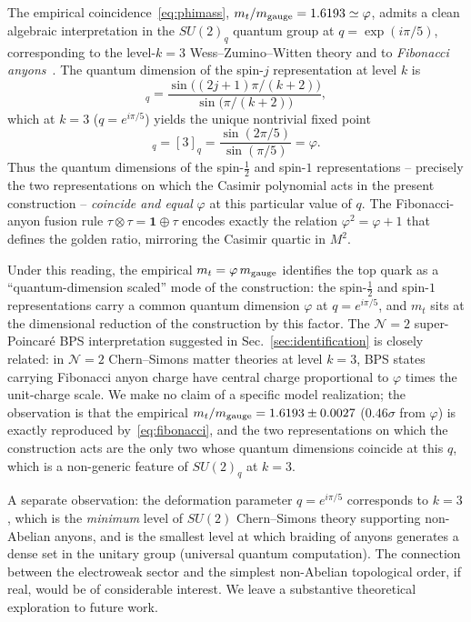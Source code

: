 \documentclass[twocolumn,aps,prd,floatfix,nofootinbib,superscriptaddress,10pt]{article}
\begin{document}
The empirical coincidence~\eqref{eq:phimass}, $m_t/m_{\rm gauge}=1.6193\simeq\varphi$, admits a clean algebraic interpretation in the $SU(2)_q$ quantum group at $q=\exp(i\pi/5)$, corresponding to the level-$k=3$ Wess--Zumino--Witten theory and to {\em Fibonacci anyons}~\cite{Trebst2008}. The quantum dimension of the spin-$j$ representation at level $k$ is
\begin{equation}
[2j+1]_q = \frac{\sin\bigl((2j+1)\pi/(k+2)\bigr)}{\sin\bigl(\pi/(k+2)\bigr)},
\label{eq:qdim}
\end{equation}
which at $k=3$ ($q=e^{i\pi/5}$) yields the unique nontrivial fixed point
\begin{equation}
[2]_q = [3]_q = \frac{\sin(2\pi/5)}{\sin(\pi/5)} = \varphi.
\label{eq:fibonacci}
\end{equation}
Thus the quantum dimensions of the spin-$\tfrac12$ and spin-$1$ representations -- precisely the two representations on which the Casimir polynomial acts in the present construction -- {\em coincide and equal} $\varphi$ at this particular value of $q$. The Fibonacci-anyon fusion rule $\tau\otimes\tau=\mathbf{1}\oplus\tau$ encodes exactly the relation $\varphi^2=\varphi+1$ that defines the golden ratio, mirroring the Casimir quartic in $M^2$.

Under this reading, the empirical $m_t=\varphi\,m_{\rm gauge}$ identifies the top quark as a ``quantum-dimension scaled'' mode of the construction: the spin-$\tfrac12$ and spin-$1$ representations carry a common quantum dimension $\varphi$ at $q=e^{i\pi/5}$, and $m_t$ sits at the dimensional reduction of the construction by this factor. The $\mathcal{N}=2$ super-Poincar\'e BPS interpretation suggested in Sec.~\ref{sec:identification} is closely related: in $\mathcal{N}=2$ Chern--Simons matter theories at level $k=3$, BPS states carrying Fibonacci anyon charge have central charge proportional to $\varphi$ times the unit-charge scale. We make no claim of a specific model realization; the observation is that the empirical $m_t/m_{\rm gauge}=1.6193\pm 0.0027$ ($0.46\sigma$ from $\varphi$) is exactly reproduced by~\eqref{eq:fibonacci}, and the two representations on which the construction acts are the only two whose quantum dimensions coincide at this $q$, which is a non-generic feature of $SU(2)_q$ at $k=3$.

A separate observation: the deformation parameter $q=e^{i\pi/5}$ corresponds to $k=3$, which is the {\em minimum} level of $SU(2)$ Chern--Simons theory supporting non-Abelian anyons, and is the smallest level at which braiding of anyons generates a dense set in the unitary group (universal quantum computation). The connection between the electroweak sector and the simplest non-Abelian topological order, if real, would be of considerable interest. We leave a substantive theoretical exploration to future work.
\end{document}
